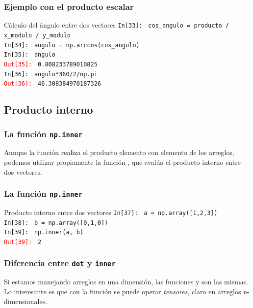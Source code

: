 \begin{frame}[fragile]
\frametitle{Ejemplo con el producto escalar}
\fontsize{12}{12}\selectfont
\begin{exampleblock}{Cálculo del ángulo entre dos vectores}
\textcolor{ao}{\texttt{In[33]: }} \texttt{cos\_angulo = producto / x\_modulo / y\_modulo} \\
\medskip
\pause
\textcolor{ao}{\texttt{In[34]: }} \texttt{angulo = np.arccos(cos\_angulo)} \\
\medskip
\pause
\textcolor{ao}{\texttt{In[35]: }} \texttt{angulo} \\
\medskip
\pause
\textcolor{red}{\texttt{Out[35]: }} \texttt{0.808233789010825} \\
\medskip
\pause
\textcolor{ao}{\texttt{In[36]: }} \texttt{angulo*360/2/np.pi} \\
\medskip
\pause
\textcolor{red}{\texttt{Out[36]: }} \texttt{46.308384970187326}
\end{exampleblock}
\end{frame}
\subsection{Producto interno}
\begin{frame}
\frametitle{La función \texttt{np.inner}}
Aunque la función  realiza el producto elemento con elemento de los arreglos, podemos utilizar propiamente la función , que evalúa el producto interno entre dos vectores.
\end{frame}
\begin{frame}[fragile]
\frametitle{La función \texttt{np.inner}}
\fontsize{12}{2}\selectfont
\begin{exampleblock}{Producto interno entre dos vectores}
\textcolor{ao}{\texttt{In[37]: }} \texttt{a = np.array([1,2,3])} \\
\medskip
\pause
\textcolor{ao}{\texttt{In[38]: }} \texttt{b = np.array([0,1,0])} \\
\medskip
\pause
\textcolor{ao}{\texttt{In[39]: }} \texttt{np.inner(a, b)} \\
\medskip
\pause
\textcolor{red}{\texttt{Out[39]: }} \texttt{2}
\end{exampleblock}
\end{frame}
\begin{frame}
\frametitle{Diferencia entre \texttt{dot} y \texttt{inner}}
Si estamos manejando arreglos en una dimensión, las funciones  y  son las mismas.
\\
\bigskip
Lo interesante es que con la función  se puede operar \emph{tensores}, claro en arreglos n-dimensionales.
\end{frame}
